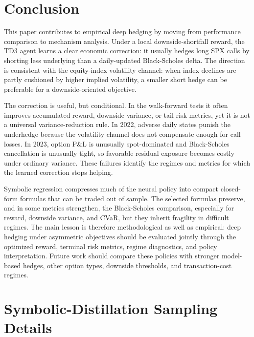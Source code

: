 \documentclass[a4paper,12pt]{article}
\numberwithin{equation}{section}
\begin{document}
\section{Conclusion}

This paper contributes to empirical deep hedging by moving from performance comparison to mechanism analysis. Under a local downside-shortfall reward, the TD3 agent learns a clear economic correction: it usually hedges long SPX calls by shorting less underlying than a daily-updated Black-Scholes delta. The direction is consistent with the equity-index volatility channel: when index declines are partly cushioned by higher implied volatility, a smaller short hedge can be preferable for a downside-oriented objective.

The correction is useful, but conditional. In the walk-forward tests it often improves accumulated reward, downside variance, or tail-risk metrics, yet it is not a universal variance-reduction rule. In 2022, adverse daily states punish the underhedge because the volatility channel does not compensate enough for call losses. In 2023, option P\&L is unusually spot-dominated and Black-Scholes cancellation is unusually tight, so favorable residual exposure becomes costly under ordinary variance. These failures identify the regimes and metrics for which the learned correction stops helping.

Symbolic regression compresses much of the neural policy into compact closed-form formulas that can be traded out of sample. The selected formulas preserve, and in some metrics strengthen, the Black-Scholes comparison, especially for reward, downside variance, and CVaR, but they inherit fragility in difficult regimes. The main lesson is therefore methodological as well as empirical: deep hedging under asymmetric objectives should be evaluated jointly through the optimized reward, terminal risk metrics, regime diagnostics, and policy interpretation. Future work should compare these policies with stronger model-based hedges, other option types, downside thresholds, and transaction-cost regimes.

\clearpage



\clearpage
\appendix

\section{Symbolic-Distillation Sampling Details}
\label{sec:appendix_focus_sampling}
\end{document}
